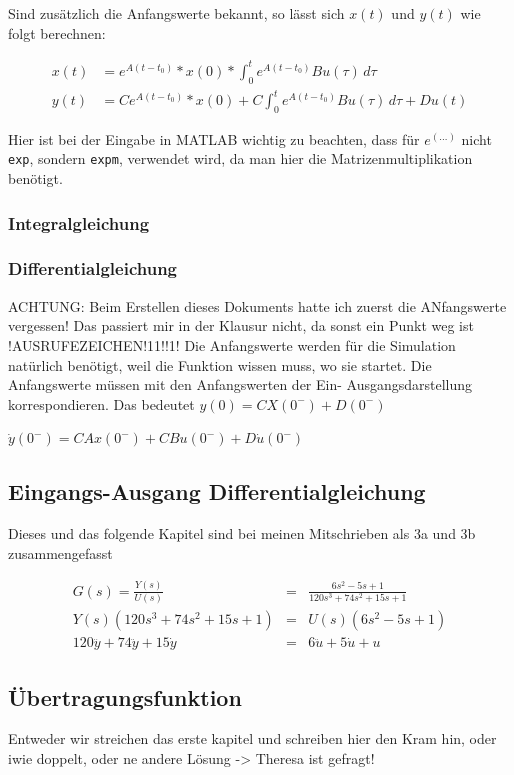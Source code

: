 Sind zusätzlich die Anfangswerte bekannt, so lässt sich $x(t)$ und $y(t)$ wie folgt berechnen:

\begin{align*}
    x(t) & = e^{A(t-t_0)} * x(0) * \int_{0}^{t} e^{A(t-t_0)}Bu(\tau) \,d\tau \nonumber \\
    y(t) & = Ce^{A(t-t_0)} * x(0) + C \int_{0}^{t} e^{A(t-t_0)}Bu(\tau) \,d\tau + Du(t)
\end{align*}

Hier ist bei der Eingabe in MATLAB wichtig zu beachten, dass für $e^{(\ldots)}$ nicht \texttt{exp}, sondern \texttt{expm}, verwendet wird, da man hier die Matrizenmultiplikation benötigt.

\subsubsection{Integralgleichung}
\subsubsection{Differentialgleichung}

ACHTUNG: Beim Erstellen dieses Dokuments hatte ich zuerst die ANfangswerte vergessen! Das passiert mir in der Klausur nicht, da sonst ein Punkt weg ist !AUSRUFEZEICHEN!11!!1!
Die Anfangswerte werden für die Simulation natürlich benötigt, weil die Funktion wissen muss, wo sie startet.
Die Anfangswerte müssen mit den Anfangswerten der Ein-  Ausgangsdarstellung korrespondieren. 
Das bedeutet $y(0) = CX(0^-) + D(0^-)$

$ \dot y(0^-) = CAx(0^-) + CBu(0^-) + D \dot u (0^-)$

\subsection{Eingangs-Ausgang Differentialgleichung}

Dieses und das folgende Kapitel sind bei meinen Mitschrieben als 3a und 3b zusammengefasst

\begin{eqnarray*}
    G(s) =\frac{Y(s)}{U(s)} &=& \frac{6s^2 - 5s + 1}{120s^3 + 74s^2 + 15s +1} \\
    Y(s)(120s^3 + 74s^2 + 15s +1) &=& U(s) (6s^2 - 5s + 1) \\
    120 \dddot y + 74 \ddot y + 15 \dot y &=& 6 \ddot u + 5 \dot u + u
\end{eqnarray*}

\subsection{Übertragungsfunktion}
Entweder wir streichen das erste kapitel und schreiben hier den Kram hin, oder iwie doppelt, oder ne andere Lösung -> Theresa ist gefragt!

